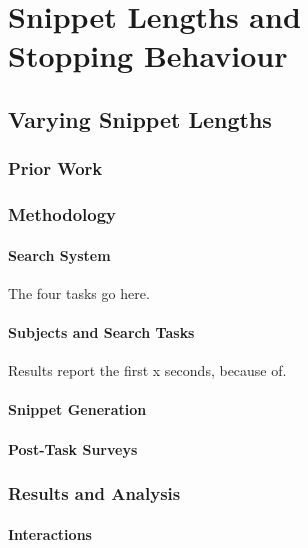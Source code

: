 
\chapter[Snippet Lengths and Stopping Behaviour]{Snippet Lengths and\\Stopping Behaviour}\label{chap:snippets}

\section{Varying Snippet Lengths}

\subsection{Prior Work}

\subsection{Methodology}

\subsubsection{Search System}
The four tasks go here.

\subsubsection{Subjects and Search Tasks}
Results report the first x seconds, because of.

\subsubsection{Snippet Generation}

\subsubsection{Post-Task Surveys}

\subsection{Results and Analysis}

\subsubsection{Interactions}

